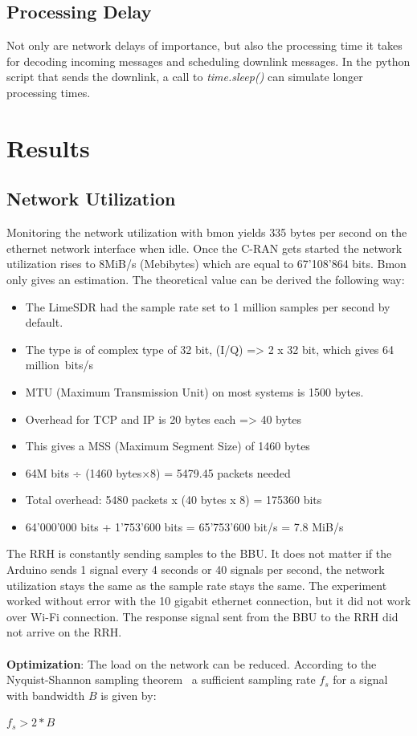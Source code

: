 \subsection{Processing Delay}
Not only are network delays of importance, but also the processing time it takes for decoding incoming messages and scheduling downlink messages.
In the python script that sends the downlink, a call to \emph{time.sleep()} can simulate longer processing times.


\section{Results}
\subsection{Network Utilization}
Monitoring the network utilization with bmon yields 
335 bytes per second on the ethernet network interface when idle. Once the C-RAN gets started the network
utilization rises to 8MiB/s (Mebibytes) which are equal to 67’108’864 bits.
Bmon only gives an estimation. The theoretical value can be derived the following way:
\\
\begin{itemize}
    \item The LimeSDR had the sample rate set to 1 million samples per second by default.
    \item The type is of complex type of 32 bit, (I/Q) => 2 x 32 bit, which gives 64 million~bits/s
    \item MTU (Maximum Transmission Unit) on most systems is 1500 bytes.
    \item Overhead for TCP and IP is 20 bytes each => 40 bytes
    \item This gives a MSS (Maximum Segment Size) of 1460 bytes
    \item 64M bits ÷ (1460 bytes×8) = 5479.45 packets needed
    \item Total overhead: 5480 packets x (40 bytes x 8) = 175360 bits
    \item 64’000’000 bits + 1’753’600 bits = 65’753’600 bit/s = 7.8 MiB/s
\end{itemize}

The RRH is constantly sending samples to the BBU. It does not matter if the Arduino 
sends 1 signal every 4 seconds or 40 signals per second, the network utilization stays the same
as the sample rate stays the same. The experiment worked without error with the 
10 gigabit ethernet connection, but it did not work over Wi-Fi connection.
The response signal sent from the BBU to the RRH did not arrive on the RRH.
\\
\\
\textbf{Optimization}: The load on the network can be reduced. According to the Nyquist-Shannon sampling theorem~\cite{Shannon1949}
a sufficient sampling rate $f_{s}$ for a signal with bandwidth $B$ is given by:
\begin{center}
    $f_{s} > 2*B$  
\end{center}

